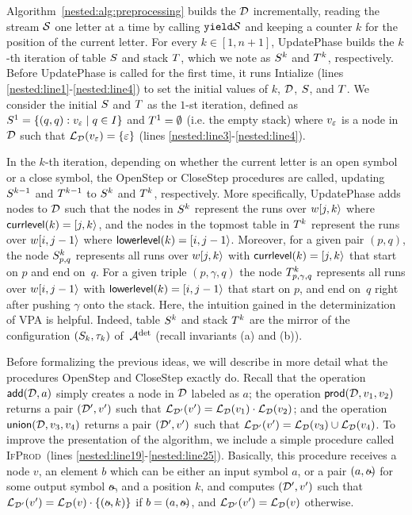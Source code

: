 Algorithm~\ref{nested:alg:preprocessing} builds the \dsepsabbr $\mathcal{D}$ incrementally, reading the stream $\mathcal{S}$ one letter at a time by calling $\texttt{yield}{\mathcal{S}}$ and keeping a counter $k$ for the position of the current letter. 
For every $k \in [1,n+1]$, {\sc UpdatePhase} builds the $k$-th iteration of table $S$ and stack $T$, which we note as $S^k$ and $T^k$, respectively. 
Before {\sc UpdatePhase} is called for the first time, it runs {\sc Intialize} (lines \ref{nested:line1}-\ref{nested:line4}) to set the initial values of $k$, $\mathcal{D}$, $S$, and $T$.
We consider the initial $S$ and $T$ as the $1$-st iteration, defined as $S^1 = \{(q,q): v_\varepsilon \mid q \in I\}$ and $T^1 = \emptyset$ (i.e. the empty stack) where $v_\varepsilon$ is a node in $\mathcal{D}$ such that $\mathcal{L}_{\mathcal{D}}(v_\varepsilon) = \{\varepsilon\}$ (lines \ref{nested:line3}-\ref{nested:line4}).

In the $k$-th iteration, depending on whether the current letter is an open symbol or a close symbol, the {\sc OpenStep} or {\sc CloseStep} procedures are called, updating $S^{k-1}$ and $T^{k-1}$ to $S^{k}$ and $T^{k}$, respectively.  
More specifically, {\sc UpdatePhase} adds nodes to $\mathcal{D}$ such that the nodes in $S^k$ represent the runs over $w[j,k\rangle$ where ${\sf currlevel}(k)=[j,k\rangle$, and the nodes in the topmost table in $T^k$ represent the runs over $w[i,j-1\rangle$ where ${\sf lowerlevel}(k) = [i,j-1\rangle$. 
Moreover, for a given pair $(p,q)$, the node $S^k_{p,q}$ represents all runs over $w[j,k\rangle$ with ${\sf currlevel}(k)=[j,k\rangle$ that start on $p$ and end on~$q$. For a given triple $(p,\gamma, q)$ the node $T^k_{p,\gamma, q}$ represents all runs over $w[i,j-1\rangle$ with ${\sf lowerlevel}(k) = [i,j-1\rangle$ that start on $p$, and end on~$q$ right after pushing $\gamma$ onto the stack. 
Here, the intuition gained in the determinization of VPA is helpful. Indeed, table $S^k$ and stack $T^k$ are the mirror of the configuration $(S_k, \tau_k)$ of~$\mathcal{A}^{\operatorname{det}}$ (recall invariants (a) and (b)).




Before formalizing the previous ideas, we will describe in more detail what the procedures {\sc OpenStep} and {\sc CloseStep} exactly do. Recall that the operation $\mathsf{add}(\mathcal{D}, a)$ simply creates a node in $\mathcal{D}$ labeled as $a$; the operation $\mathsf{prod}(\mathcal{D},v_1,v_2)$ returns a pair $(\mathcal{D}',v')$ such that $\mathcal{L}_{\mathcal{D}'}(v') = \mathcal{L}_{\mathcal{D}}(v_1) \cdot \mathcal{L}_{\mathcal{D}}(v_2)$; and the operation $\mathsf{union}(\mathcal{D},v_3,v_4)$ returns a pair $(\mathcal{D}',v')$ such that $\mathcal{L}_{\mathcal{D}'}(v') = \mathcal{L}_{\mathcal{D}}(v_3)\cup \mathcal{L}_{\mathcal{D}}(v_4)$. To improve the presentation of the algorithm, we include a simple procedure called \textsc{IfProd}~(lines \ref{nested:line19}-\ref{nested:line25}). Basically, this procedure receives a node $v$, an element $b$ which can be either an input symbol $a$, or a pair $(a, \oout)$ for some output symbol $\oout$, and a position $k$, and computes $(\mathcal{D}', v')$ such that $\L_{\cD'}(v') = \L_{\cD}(v) \cdot \{(\oout, k)\}$ if $b = (a, \oout)$, and $\mathcal{L}_{\mathcal{D}'}(v') = \mathcal{L}_{\mathcal{D}}(v)$ otherwise.


